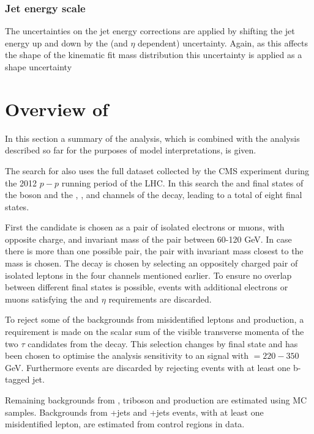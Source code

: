 \subsubsection*{Jet energy scale}
The uncertainties on the jet energy corrections are applied by shifting the jet energy up and down by the (\pT and $\eta$ dependent) uncertainty. Again, as this affects the shape of the kinematic fit mass distribution this uncertainty is applied as a shape uncertainty 


\section{\texorpdfstring{Overview of \AtoZhtolltautau}{Overview of A->Zh->lltautau}}
\label{sec:hhh_azh}
In this section a summary of the \AtoZhtolltautau analysis, which is combined with the 
analysis described so far for the purposes of model interpretations, is given.

The search for \AtoZhtolltautau also uses the full dataset collected by the CMS experiment during
the 2012 $p-p$ running period of the LHC. In this search the \mumu and \ee final states of the \PZ boson
and the \emu, \etau, \mutau and \tautau channels of the \htotautau decay, leading to a total of
eight final states. 

First the \PZ candidate is chosen as a pair of isolated electrons or muons, with opposite charge, and 
invariant mass of the pair between 60-120 GeV. In case there is more than one possible pair, the 
pair with invariant mass closest to the \PZ mass is chosen. The \htotautau decay is chosen by selecting
an oppositely charged pair of isolated leptons in the four channels mentioned earlier. To ensure no overlap
between different final states is possible, events with additional electrons or muons satisfying the
\pT and $\eta$ requirements are discarded.

To reject some of the backgrounds from misidentified leptons and \ZZ production, a requirement is made
on the scalar sum of the visible transverse momenta of the two $\tau$ candidates from the \htotautau decay.
This selection changes by final state and has been chosen to optimise the analysis sensitivity to an 
\AtoZh signal with \mA $= 220 - 350 $ GeV. Furthermore \ttbar events are discarded by rejecting
events with at least one b-tagged jet. 

Remaining backgrounds from \ZZ, triboson and \ttbar\PZ production are estimated using
\ac{MC} samples. Backgrounds from \PZ+jets %
and \WZ+jets %
events, with at least one misidentified lepton, are estimated from control regions in data.

